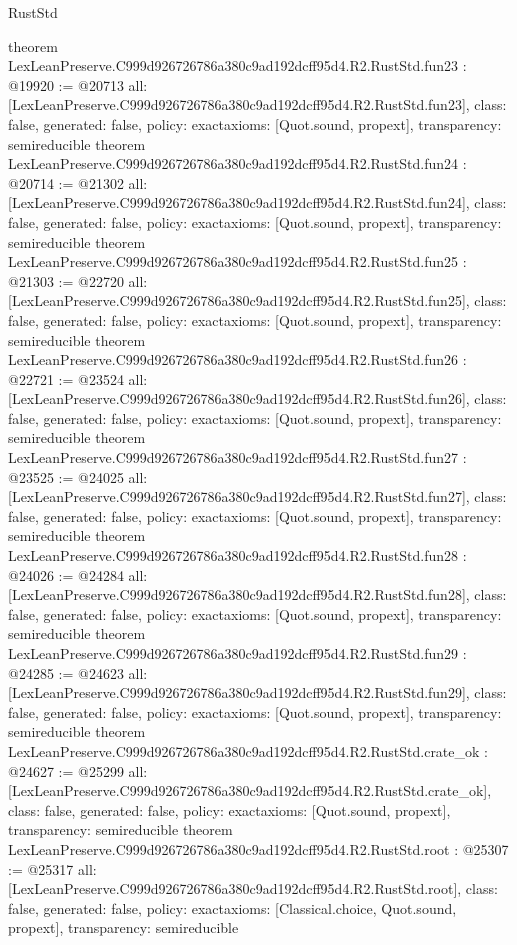 \begin{lexlean}{RustStd}
\begin{coremodule}
{}
theorem LexLeanPreserve.C999d926726786a380c9ad192dcff95d4.R2.RustStd.fun23 : @19920 := @20713 {
  all: [LexLeanPreserve.C999d926726786a380c9ad192dcff95d4.R2.RustStd.fun23],
  class: false,
  generated: false,
  policy: exact{axioms: [Quot.sound, propext]},
  transparency: semireducible
}
theorem LexLeanPreserve.C999d926726786a380c9ad192dcff95d4.R2.RustStd.fun24 : @20714 := @21302 {
  all: [LexLeanPreserve.C999d926726786a380c9ad192dcff95d4.R2.RustStd.fun24],
  class: false,
  generated: false,
  policy: exact{axioms: [Quot.sound, propext]},
  transparency: semireducible
}
theorem LexLeanPreserve.C999d926726786a380c9ad192dcff95d4.R2.RustStd.fun25 : @21303 := @22720 {
  all: [LexLeanPreserve.C999d926726786a380c9ad192dcff95d4.R2.RustStd.fun25],
  class: false,
  generated: false,
  policy: exact{axioms: [Quot.sound, propext]},
  transparency: semireducible
}
theorem LexLeanPreserve.C999d926726786a380c9ad192dcff95d4.R2.RustStd.fun26 : @22721 := @23524 {
  all: [LexLeanPreserve.C999d926726786a380c9ad192dcff95d4.R2.RustStd.fun26],
  class: false,
  generated: false,
  policy: exact{axioms: [Quot.sound, propext]},
  transparency: semireducible
}
theorem LexLeanPreserve.C999d926726786a380c9ad192dcff95d4.R2.RustStd.fun27 : @23525 := @24025 {
  all: [LexLeanPreserve.C999d926726786a380c9ad192dcff95d4.R2.RustStd.fun27],
  class: false,
  generated: false,
  policy: exact{axioms: [Quot.sound, propext]},
  transparency: semireducible
}
theorem LexLeanPreserve.C999d926726786a380c9ad192dcff95d4.R2.RustStd.fun28 : @24026 := @24284 {
  all: [LexLeanPreserve.C999d926726786a380c9ad192dcff95d4.R2.RustStd.fun28],
  class: false,
  generated: false,
  policy: exact{axioms: [Quot.sound, propext]},
  transparency: semireducible
}
theorem LexLeanPreserve.C999d926726786a380c9ad192dcff95d4.R2.RustStd.fun29 : @24285 := @24623 {
  all: [LexLeanPreserve.C999d926726786a380c9ad192dcff95d4.R2.RustStd.fun29],
  class: false,
  generated: false,
  policy: exact{axioms: [Quot.sound, propext]},
  transparency: semireducible
}
theorem LexLeanPreserve.C999d926726786a380c9ad192dcff95d4.R2.RustStd.crate_ok : @24627 := @25299 {
  all: [LexLeanPreserve.C999d926726786a380c9ad192dcff95d4.R2.RustStd.crate_ok],
  class: false,
  generated: false,
  policy: exact{axioms: [Quot.sound, propext]},
  transparency: semireducible
}
theorem LexLeanPreserve.C999d926726786a380c9ad192dcff95d4.R2.RustStd.root : @25307 := @25317 {
  all: [LexLeanPreserve.C999d926726786a380c9ad192dcff95d4.R2.RustStd.root],
  class: false,
  generated: false,
  policy: exact{axioms: [Classical.choice, Quot.sound, propext]},
  transparency: semireducible
}


\end{coremodule}
\end{lexlean}
